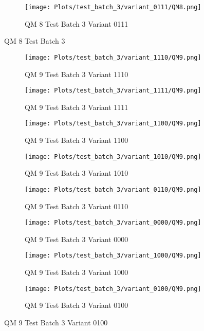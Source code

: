 \documentclass{DissertateFigs}
\begin{document}
\begin{figure}[t!]
\medskip

    \begin{subfigure}{0.38\textwidth}
    \texttt{[image: Plots/test\_batch\_3/variant\_0111/QM8.png]}
    \caption{QM 8 Test Batch 3 Variant 0111}
    \end{subfigure}
\caption{QM 8 Test Batch 3}
    \end{figure}
\clearpage
\begin{figure}[t!]
    \begin{subfigure}{0.47\textwidth}
    \texttt{[image: Plots/test\_batch\_3/variant\_1110/QM9.png]}
    \caption{QM 9 Test Batch 3 Variant 1110}
    \end{subfigure}
    \begin{subfigure}{0.47\textwidth}
    \texttt{[image: Plots/test\_batch\_3/variant\_1111/QM9.png]}
    \caption{QM 9 Test Batch 3 Variant 1111}
    \end{subfigure}

\medskip

    \begin{subfigure}{0.47\textwidth}
    \texttt{[image: Plots/test\_batch\_3/variant\_1100/QM9.png]}
    \caption{QM 9 Test Batch 3 Variant 1100}
    \end{subfigure}
    \begin{subfigure}{0.47\textwidth}
    \texttt{[image: Plots/test\_batch\_3/variant\_1010/QM9.png]}
    \caption{QM 9 Test Batch 3 Variant 1010}
    \end{subfigure}

\medskip

    \begin{subfigure}{0.47\textwidth}
    \texttt{[image: Plots/test\_batch\_3/variant\_0110/QM9.png]}
    \caption{QM 9 Test Batch 3 Variant 0110}
    \end{subfigure}
    \begin{subfigure}{0.47\textwidth}
    \texttt{[image: Plots/test\_batch\_3/variant\_0000/QM9.png]}
    \caption{QM 9 Test Batch 3 Variant 0000}
    \end{subfigure}

\medskip

    \begin{subfigure}{0.47\textwidth}
    \texttt{[image: Plots/test\_batch\_3/variant\_1000/QM9.png]}
    \caption{QM 9 Test Batch 3 Variant 1000}
    \end{subfigure}
    \begin{subfigure}{0.47\textwidth}
    \texttt{[image: Plots/test\_batch\_3/variant\_0100/QM9.png]}
    \caption{QM 9 Test Batch 3 Variant 0100}
    \end{subfigure}


\end{figure}
\end{document}
